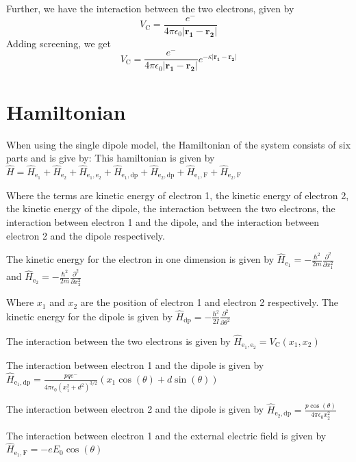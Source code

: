 Further, we have the interaction between the two electrons, given by 
\begin{equation}
    V_{\text{C}} = 
    \frac{e^-}{4 \pi \epsilon_0 |\mathbf{r_1} - \mathbf{r_2}|}
\end{equation}
Adding screening, we get
\begin{equation}
    V_{\text{C}} = 
    \frac{e^-}{4 \pi \epsilon_0 |\mathbf{r_1} - \mathbf{r_2}|} 
    e ^ {-\kappa |\mathbf{r_1} - \mathbf{r_2}|}
\end{equation}


\section{Hamiltonian}
When using the single dipole model, the Hamiltonian of the system consists of six parts and is give by:  This hamiltonian is given by $\hat{H} = \hat{H}_{\text{e}_1} + \hat{H}_{\text{e}_2} + \hat{H}_{\text{e}_1 , \text{e}_2} + \hat{H}_{\text{e}_1 , \text{dp}} + \hat{H}_{\text{e}_2 , \text{dp}} + \hat{H}_{\text{e}_1 , \text{F}} + \hat{H}_{\text{e}_2 , \text{F}}$

Where the terms are kinetic energy of electron 1, the kinetic energy of electron 2, the kinetic energy of the dipole, the interaction between the two electrons, the interaction between electron 1 and the dipole, and the interaction between electron 2 and the dipole respectively.

The kinetic energy for the electron in one dimension is given by $\hat{H}_{\text{e}_1} = -\frac{\hbar^2}{2m}\frac{\partial^2}{\partial x_1^2}$ and $\hat{H}_{\text{e}_2} = -\frac{\hbar^2}{2m}\frac{\partial^2}{\partial x_2^2}$

Where $x_1$ and $x_2$ are the position of electron 1 and electron 2 respectively.
The kinetic energy for the dipole is given by $\hat{H}_{\text{dp}} = -\frac{\hbar^2}{2I}\frac{\partial^2}{\partial \theta^2}$

The interaction between the two electrons is given by $\hat{H}_{\text{e}_1 , \text{e}_2} = V_\text{C}(x_1, x_2)$

The interaction between electron 1 and the dipole is given by $\hat{H}_{\text{e}_1 , \text{dp}} = \frac{pq  e^-}{4 \pi \epsilon_0 (x_1^2 + d^2)^{3/2}} (x_1 \cos(\theta) + d \sin(\theta))$

The interaction between electron 2 and the dipole is given by $\hat{H}_{\text{e}_2 , \text{dp}} = \frac{p \cos(\theta)}{4 \pi \epsilon_0 x_2^2}$

The interaction between electron 1 and the external electric field is given by $\hat{H}_{\text{e}_1 , \text{F}} = -e E_0 \cos(\theta)$

